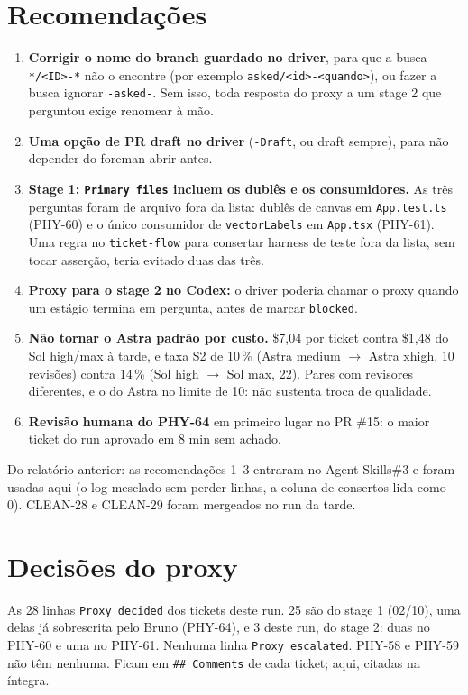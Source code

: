 \documentclass[11pt,a4paper]{article}
\begin{document}
\section{Recomendações}
\begin{enumerate}
  \item \textbf{Corrigir o nome do branch guardado no driver}, para que a busca
        \texttt{*/<ID>-*} não o encontre (por exemplo
        \texttt{asked/<id>-<quando>}), ou fazer a busca ignorar
        \texttt{-asked-}. Sem isso, toda resposta do proxy a um stage 2 que
        perguntou exige renomear à mão.
  \item \textbf{Uma opção de PR draft no driver} (\texttt{-Draft}, ou draft
        sempre), para não depender do foreman abrir antes.
  \item \textbf{Stage 1: \texttt{Primary files} incluem os dublês e os
        consumidores.} As três perguntas foram de arquivo fora da lista:
        dublês de canvas em \texttt{App.test.ts} (PHY-60) e o único consumidor
        de \texttt{vectorLabels} em \texttt{App.tsx} (PHY-61). Uma regra no
        \texttt{ticket-flow} para consertar harness de teste fora da lista,
        sem tocar asserção, teria evitado duas das três.
  \item \textbf{Proxy para o stage 2 no Codex:} o driver poderia chamar o proxy
        quando um estágio termina em pergunta, antes de marcar
        \texttt{blocked}.
  \item \textbf{Não tornar o Astra padrão por custo.} \$7,04 por ticket contra
        \$1,48 do Sol high/max à tarde, e taxa S2 de 10\,\% (Astra medium $\to$
        Astra xhigh, 10 revisões) contra 14\,\% (Sol high $\to$ Sol max, 22).
        Pares com revisores diferentes, e o do Astra no limite de 10: não
        sustenta troca de qualidade.
  \item \textbf{Revisão humana do PHY-64} em primeiro lugar no PR \#15: o maior
        ticket do run aprovado em 8 min sem achado.
\end{enumerate}

Do relatório anterior: as recomendações 1--3 entraram no Agent-Skills\#3 e foram
usadas aqui (o log mesclado sem perder linhas, a coluna de consertos lida
como 0). CLEAN-28 e CLEAN-29 foram mergeados no run da tarde.

\section{Decisões do proxy}

As 28 linhas \texttt{Proxy decided} dos tickets deste run. 25 são do stage 1
(02/10), uma delas já sobrescrita pelo Bruno (PHY-64), e 3 deste run, do stage
2: duas no PHY-60 e uma no PHY-61. Nenhuma linha
\texttt{Proxy escalated}. PHY-58 e PHY-59 não têm nenhuma. Ficam em
\texttt{\#\# Comments} de cada ticket; aqui, citadas na íntegra.
\end{document}
